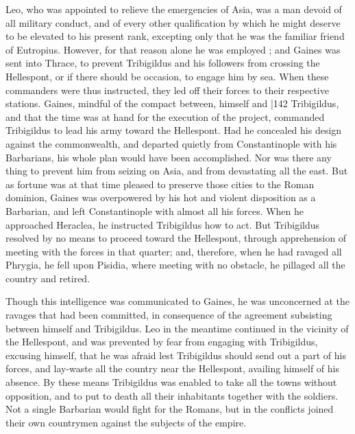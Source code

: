 Leo, who was appointed to relieve the emergencies of Asia, was a man devoid of all military conduct, and of every other qualification by which he might deserve to be elevated to his present rank, excepting only that he was the familiar friend of Eutropius. However, for that reason alone he was employed ; and Gaines was sent into Thrace, to prevent Tribigildus and his followers from crossing the Hellespont, or if there should be occasion, to engage him by sea. When these commanders were thus instructed, they led off their forces to their respective stations. Gaines, mindful of the compact between, himself and
|142 Tribigildus, and that the time was at hand for the execution of the project, commanded Tribigildus to lead his army toward the Hellespont. Had he concealed his design against the commonwealth, and departed quietly from Constantinople with his Barbarians, his whole plan would have been accomplished. Nor was there any thing to prevent him from seizing on Asia, and from devastating all the east. But as fortune was at that time pleased to preserve those cities to the Roman dominion, Gaines was overpowered by his hot and violent disposition as a Barbarian, and left Constantinople with almost all his forces. When he approached Heraclea, he instructed Tribigildus how to act. But Tribigildus resolved by no means to proceed toward the Hellespont, through apprehension of meeting with the forces in that quarter; and, therefore, when he had ravaged all Phrygia, he fell upon Pisidia, where meeting with no obstacle, he pillaged all the country and retired.

Though this intelligence was communicated to Gaines, he was unconcerned at the ravages that had been committed, in consequence of the agreement subsisting between himself and Tribigildus. Leo in the meantime continued in the vicinity of the Hellespont, and was prevented by fear from engaging with Tribigildus, excusing himself, that he was afraid lest Tribigildus should send out a part of his forces, and lay-waste all the country near the Hellespont, availing himself of his absence. By these means Tribigildus was enabled to take all the towns without opposition, and to put to death all their inhabitants together with the soldiers. Not a single Barbarian would fight for the Romans, but in the conflicts joined their own countrymen against the subjects of the empire.


